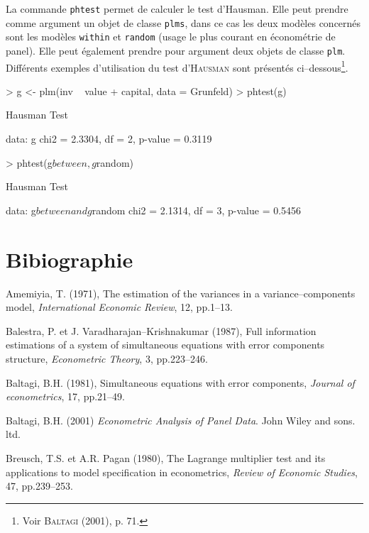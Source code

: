 \documentclass[a4paper]{article}
\begin{document}
La commande \texttt{phtest} permet de calculer le test d'Hausman. Elle
peut prendre comme argument un objet de classe \texttt{plms}, dans ce
cas les deux modèles concernés sont les modèles \texttt{within} et
\texttt{random} (usage le plus courant en économétrie de panel). Elle
peut également prendre pour argument deux objets de classe \texttt{plm}.
Différents exemples d'utilisation du test d'\textsc{Hausman}
sont présentés ci--dessous\footnote{Voir \textsc{Baltagi} (2001), p. 71.}.


\begin{Schunk}
\begin{Sinput}
> g <- plm(inv ~ value + capital, data = Grunfeld)
> phtest(g)
\end{Sinput}
\begin{Soutput}
	Hausman Test

data:  g 
chi2 = 2.3304, df = 2, p-value = 0.3119
\end{Soutput}
\begin{Sinput}
> phtest(g$between, g$random)
\end{Sinput}
\begin{Soutput}
	Hausman Test

data:  g$between and g$random 
chi2 = 2.1314, df = 3, p-value = 0.5456
\end{Soutput}
\end{Schunk}


\section{Bibiographie}

\setlength{\parindent}{0em}
\setlength{\parskip}{0.4cm}

  Amemiyia, T. (1971), The estimation of the variances in a
  variance--components model, \emph{International Economic Review}, 12,
  pp.1--13.

  Balestra, P. et J. Varadharajan--Krishnakumar (1987), Full
  information estimations of a system of simultaneous equations with
  error components structure, \emph{Econometric Theory}, 3, pp.223--246.
  
  Baltagi, B.H. (1981), Simultaneous equations with error components,
  \emph{Journal of econometrics}, 17, pp.21--49.
  
  Baltagi, B.H. (2001) \emph{Econometric Analysis of Panel Data}. John
  Wiley and sons. ltd.

  Breusch, T.S. et A.R. Pagan (1980), The Lagrange multiplier test and
  its applications to model specification in econometrics, \emph{Review
    of Economic Studies}, 47, pp.239--253.
\end{document}
